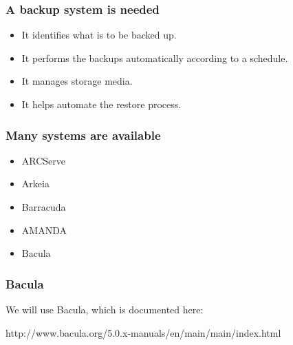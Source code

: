 \documentclass[10pt]{beamer}
\begin{document}
\begin{frame}
  \frametitle{A backup system is needed}

\begin{itemize}
\item It identifies what is to be backed up.
\item It performs the backups automatically according to a schedule.
\item It manages storage media.
\item It helps automate the restore process.
\end{itemize}
\end{frame}


\begin{frame}
  \frametitle{Many systems are available}

\begin{itemize}
\item ARCServe
\item Arkeia
\item Barracuda
\item AMANDA
\item Bacula
\end{itemize}
\end{frame}

\begin{frame}
  \frametitle{Bacula}

  We will use Bacula, which is documented here:
  
  http://www.bacula.org/5.0.x-manuals/en/main/main/index.html

\end{frame}
\end{document}
